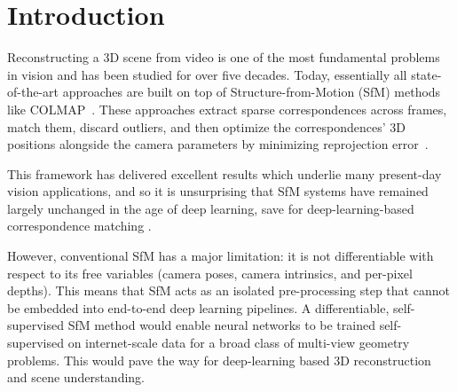\section{Introduction}

\label{sec:intro}

Reconstructing a 3D scene from video is one of the most fundamental problems in vision and has been studied for over five decades.
Today, essentially all state-of-the-art approaches are built on top of Structure-from-Motion (SfM) methods like COLMAP~\cite{schonberger2016structure}. These approaches extract sparse correspondences across frames, match them, discard outliers, and then optimize the correspondences' 3D positions alongside the camera parameters by minimizing reprojection error~\cite{schonberger2016structure}.

This framework has delivered excellent results which underlie many present-day vision applications, and so it is unsurprising that SfM systems have remained largely unchanged in the age of deep learning, save for deep-learning-based correspondence matching \cite{sarlin2020superglue,lindenberger2023lightglue,sarlin2021pixloc,detone2018superpoint}.

However, conventional SfM has a major limitation: it is not differentiable with respect to its free variables (camera poses, camera intrinsics, and per-pixel depths).
This means that SfM acts as an isolated pre-processing step that cannot be embedded into end-to-end deep learning pipelines. 
A differentiable, self-supervised SfM method would enable neural networks to be trained self-supervised on internet-scale data for a broad class of multi-view geometry problems.
This would pave the way for deep-learning based 3D reconstruction and scene understanding.

